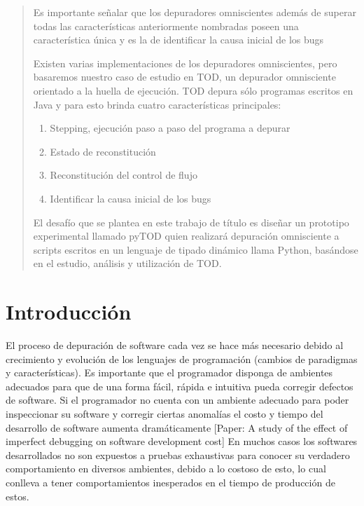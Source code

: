 \documentclass[12pt,legalpaper]{report}
\begin{document}
\begin{abstract}
Es importante señalar que los depuradores omniscientes además de superar todas las características anteriormente nombradas poseen una característica única y es la de identificar la causa inicial de los bugs\footnotemark[2]

Existen varias implementaciones de los depuradores omniscientes, pero basaremos nuestro caso de estudio en TOD\footnotemark[3], un depurador omnisciente orientado a la huella de ejecución.  TOD depura sólo programas escritos en Java y para esto brinda cuatro características principales:
\begin{enumerate}
         \item Stepping, ejecución paso a paso del programa a depurar
         \item Estado de reconstitución
         \item Reconstitución del control de flujo
         \item Identificar la causa inicial de los bugs
\end{enumerate}

El desafío que se plantea en este trabajo de título es diseñar un prototipo experimental llamado pyTOD quien realizará depuración omnisciente a scripts escritos en un lenguaje de tipado dinámico llama Python, basándose en el estudio, análisis y utilización de TOD.


\end{abstract}

\newpage
\tableofcontents
\newpage
\listoffigures
\newpage
\listoftables
\newpage

\chapter{Introducción}

El proceso de depuración de software cada vez se hace más necesario debido al crecimiento y evolución de los lenguajes de programación (cambios de paradigmas y características).  Es importante que el programador disponga de ambientes adecuados para que de una forma fácil, rápida e intuitiva pueda corregir defectos de software.  Si el programador no cuenta con un ambiente adecuado para poder inspeccionar su software y corregir ciertas anomalías el costo y tiempo del desarrollo de software aumenta dramáticamente [Paper: A study of the effect of  imperfect debugging on software development cost]  En muchos casos los softwares desarrollados no son expuestos a pruebas exhaustivas para conocer su verdadero comportamiento en diversos ambientes, debido a lo costoso de esto, lo cual conlleva a tener comportamientos inesperados en el tiempo de producción de estos.
\end{document}
